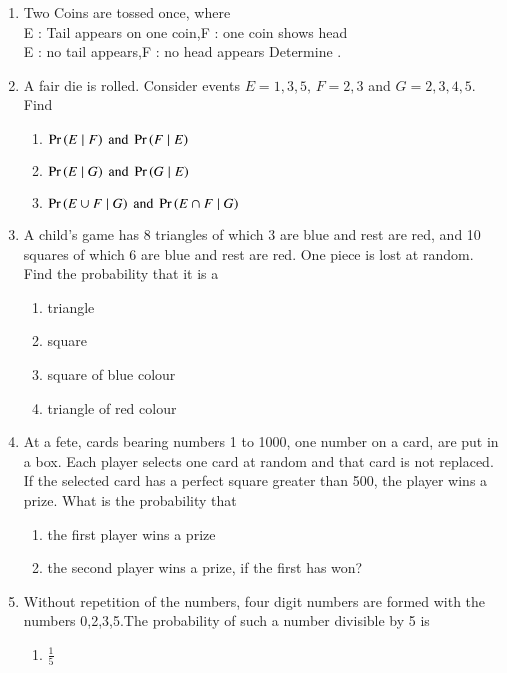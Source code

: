 \begin{enumerate}[label=\thesubsection.\arabic*,ref=\thesubsection.\theenumi]
\\
\solution 

\item Two Coins are tossed once, where\\
 E : Tail appears on one coin,\qquad F : one coin shows head\\
  E : no tail appears,\qquad\qquad\qquad F : no head appears
Determine .
%
\item A fair die is rolled. Consider events $E=1,3,5,\, F=2,3$ and $G=2,3,4,5$. Find
\begin{enumerate}
\item $\Pr\left(E \mid F\right) \text{ and } \Pr\left(F \mid E\right)$
\item $\Pr\left(E \mid G\right) \text{ and } \Pr\left(G \mid E\right)$
\item $\Pr\left({E \cup F} \mid G\right) \text{ and } \Pr\left({E \cap F} \mid G\right)$
\end{enumerate}
%
\solution
%
\item A child's game has 8 triangles of which 3 are blue and rest are red, and 10 squares of which 6 are blue and rest are red. One piece is lost at random. Find the probability that it is a
\begin{enumerate}
\item triangle 
\item square 
\item square of blue colour 
\item triangle of red colour           
\end{enumerate}
\solution
%
\item At a fete, cards bearing numbers 1 to 1000, one number on a card, are put in a box. Each player selects one card at random and that card is not replaced. If the selected card has a perfect square greater than 500, the player wins a prize. What is the probability that 
\begin{enumerate}
\item the first player wins a prize
\item the second player wins a prize, if the first has won?
\end{enumerate}
\solution
%
\item Without repetition of the numbers, four digit numbers are formed with the numbers 0,2,3,5.The
probability of such a number divisible by 5 is
\begin{enumerate}
\item $\frac{1}{5}$ 

\end{enumerate}
\end{enumerate}

